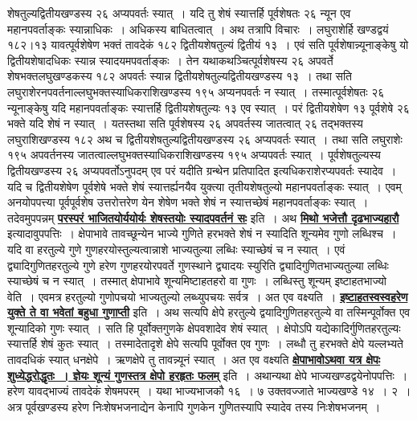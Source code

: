 \documentclass[11pt, openany]{book}
\begin{document}
{{शेषतुल्यद्वितीयखण्डस्य २६ अप्यपवर्तः स्यात्~। यदि तु शेषं स्यात्तर्हि
पूर्वशेषतः २६ न्यून एव महानपवर्ताङ्कः स्यान्नाधिकः~। अधिकस्य
बाधितत्वात्~। अथ तत्रापि विचारः~। लघुराशेर्हि खण्डद्वयं १८२।१३ यावत्पूर्वशेषेण भक्तं तावदेकं १८२ द्वितीयशेषतुल्यं द्वितीयं १३~। एवं सति
पूर्वशेषान्न्यूनाङ्केषु 
यो द्वितीयशेषादधिकः स्यान्न स्यादयमपवर्ताङ्कः~। तेन यथाकथञ्चित्पूर्वशेषस्य
२६ अपवर्ते शेषभक्तलघुखण्डकस्य १८२ अपवर्तः स्यान्न
द्वितीयशेषतुल्यद्वितीयखण्डस्य १३~। तथा सति लघुराशेरनपवर्तनाल्लघुभक्तस्याधिकराशिखण्डस्य 
१९५ अप्यनपवर्तः न स्यात्~। तस्मात्पूर्वशेषतः २६ न्यूनाङ्केषु यदि 
महानपवर्ताङ्कः स्यात्तर्हि द्वितीयशेषतुल्यः १३ एव स्यात्~। परं
द्वितीयशेषेण १३ पूर्वशेषे २६ भक्ते यदि शेषं न स्यात्~। यतस्तथा सति पूर्वशेषस्य 
२६ अपवर्तस्य जातत्वात् २६ तद्भक्तस्य लघुराशिखण्डस्य १८२ अथ च
द्वितीयशेषतुल्यद्वितीयखण्डस्य २६ अप्यपवर्तः स्यात्~। तथा सति लघुराशेः 
१९५ अपवर्तनस्य जातत्वाल्लघुभक्तस्याधिकराशिखण्डस्य १९५ अप्यपवर्तः
स्यात्~। 
पूर्वशेषतुल्यस्य द्वितीयखण्डस्य २६ अप्यपवर्तोऽनुपदम् एव परं यदीति
ग्रन्थेन प्रतिपादित इत्यधिकराशेरप्यपवर्तः स्यादेव~। यदि च द्वितीयशेषेण
पूर्वशेषे भक्ते शेषं स्यात्तर्ह्यनयैव युक्त्या तृतीयशेषतुल्यो महानपवर्ताङ्कः स्यात्~। एवम् अनयोपपत्त्या पूर्वपूर्वशेष उत्तरोत्तरेण येन शेषेण भक्ते शेषं न स्यात्तच्छेषं
महानपवर्ताङ्कः स्यात्~। तदेवमुपपन्नम् \hyperref[51]{\textbf{परस्परं भाजितयोर्ययोर्यः शेषस्तयोः स्यादपवर्तनं सः}} इति~।
\newpage
अथ \hyperref[51]{\textbf{मिथो भजेत्तौ दृढभाज्यहारौ}} इत्यादावुपपत्तिः~। क्षेपाभावे तावच्छून्येन 
भाज्ये गुणिते हरभक्ते शेषं न स्यादिति शून्यमेव गुणो लब्धिश्च~। यदि वा 
हरतुल्ये गुणे गुणहरयोस्तुल्यत्वान्नाशे भाज्यतुल्या लब्धिः स्याच्छेषं
च न स्यात्~। एवं द्व्यादिगुणितहरतुल्ये गुणे हरेण गुणहरयोरपवर्ते गुणस्थाने 
द्व्यादयः स्युरिति द्व्यादिगुणितभाज्यतुल्या लब्धिः स्याच्छेषं च न स्यात्~। 
तस्मात् क्षेपाभावे शून्यमिष्टाहतहरो वा गुणः~। लब्धिस्तु
शून्यम् इष्टाहतभाज्यो वेति~। 
एवमत्र हरतुल्यो गुणोपचयो भाज्यतुल्यो लब्ध्युपचयः सर्वत्र~। अत एव
वक्ष्यति~। \hyperref[59]{\textbf{इष्टाहतस्वस्वहरेण युक्ते ते वा भवेतां बहुधा गुणाप्ती}} इति~। अथ
सत्यपि क्षेपे हरतुल्ये  द्वयादिगुणितहरतुल्ये वा तस्मिन्पूर्वोक्त एव
शून्यादिको गुणः स्यात्~। सति हि पूर्वोक्तगुणके क्षेपवशादेव शेषं स्यात्~। क्षेपोऽपि
यद्येकादिर्गुणितहरतुल्यः स्यात्तर्हि शेषं कुतः स्यात्~। तस्मादेतादृशे
क्षेपे सत्यपि पूर्वोक्त एव गुणः~। लब्धौ तु हरभक्ते क्षेपे यल्लभ्यते तावदधिकं स्यात् 
धनक्षेपे~। ऋणक्षेपे तु तावन्न्यूनं स्यात्~। अत एव वक्ष्यति
\hyperref[58]{\textbf{क्षेपाभावोऽथवा यत्र क्षेपः शुध्येद्धरोद्धृतः~। ज्ञेयः शून्यं गुणस्तत्र क्षेपो हरहृतः
फलम्}} इति~। अथान्यथा क्षेपे भाज्यखण्डद्वयेनोपपत्तिः~। हरेण यावद्भाज्यं तावदेकं
शेषमपरम्~। यथा भाज्यभाजकौ १६~। ७ उक्तवज्जाते भाज्यखण्डे १४~। २~। अत्र पूर्वखण्डस्य हरेण निःशेषभजनाद्येन केनापि गुणकेन गुणितस्यापि स्यादेव तस्य निःशेषभजनम्~।
}}
\end{document}
